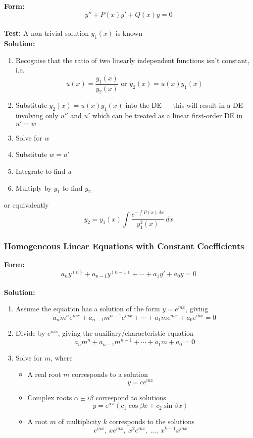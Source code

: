 \documentclass{article}
\begin{document}
\textbf{Form:} \[y'' + P(x) y' + Q(x) y = 0\] \\ \textbf{Test:} A non-trivial solution $y_1(x)$ is known \\ \textbf{Solution:} \begin{enumerate}
  \item Recognise that the ratio of two linearly independent functions isn't constant, i.e. \[u(x) = \frac{y_1(x)}{y_2(x)} \text{ or } y_2(x) = u(x) y_1(x)\]

  \item Substitute $y_2(x) = u(x) y_1(x)$ into the DE — this will result in a DE involving only $u''$ and $u'$ which can be treated as a linear first-order DE in $u' = w$

  \item Solve for $w$

  \item Substitute $w = u'$

  \item Integrate to find $u$

  \item Multiply by $y_1$ to find $y_2$
\end{enumerate} or equivalently \[y_2 = y_1(x) \int \frac{e^{-\int P(x) \,dx}}{y_1^2(x)} \,dx\]

\subsubsection{Homogeneous Linear Equations with Constant Coefficients}

\textbf{Form:} \[a_n y^{(n)} + a_{n - 1} y^{(n - 1)} + \cdots + a_1 y' + a_0 y = 0\] \\ \textbf{Solution:} \begin{enumerate}
  \item Assume the equation has a solution of the form $y = e^{mx}$, giving \[a_n m^n e^{mx} + a_{n - 1} m^{n - 1} e^{mx} + \cdots + a_1 m e^{mx} + a_0 e^{mx} = 0\]

  \item Divide by $e^{mx}$, giving the auxiliary/characteristic equation \[a_n m^n + a_{n - 1} m^{n - 1} + \cdots + a_1 m + a_0 = 0\]

  \item Solve for $m$, where

        \begin{itemize}
          \item A real root $m$ corresponds to a solution \[y = ce^{mx}\]

          \item Complex roots $\alpha \pm i \beta$ correspond to solutions \[y = e^{\alpha x} (c_1 \cos \beta x + c_2 \sin \beta x)\]

          \item A root $m$ of multiplicity $k$ corresponds to the solutions \[e^{mx}, \: x e^{mx}, \: x^2 e^{mx}, \: \ldots, \: x^{k - 1} x^{mx}\]
        \end{itemize}
\end{enumerate}
\end{document}

